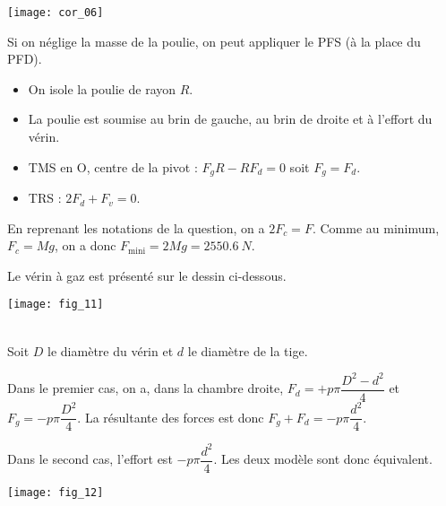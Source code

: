 \begin{multicols}{2}
\begin{corrige}
\begin{center}
\texttt{[image: cor\_06]}
\end{center}

Si on néglige la masse de la poulie, on peut appliquer le PFS (à la place du PFD).

\begin{itemize}
\item On isole la poulie de rayon $R$.
\item La poulie est soumise au brin de gauche, au brin de droite et à l'effort du vérin.
\item TMS en O, centre de la pivot : $F_g R -R F_d = 0$ soit $F_g =F_d$. 
\item TRS : $2F_d+ F_v = 0$. 
\end{itemize}
En reprenant les notations de la question, on a $2F_c = F$.
Comme au minimum, $F_c = Mg$, on a donc $F_{\text{mini}} = 2 Mg = \SI{2550,6}{N}$.
\end{corrige}
\else
\fi

\ifprof
\else
Le vérin à gaz est présenté sur le dessin ci-dessous.
\begin{center}
\texttt{[image: fig\_11]}
\end{center}
\fi

\ifprof
\begin{corrige}~\\
Soit $D$ le diamètre du vérin et $d$ le diamètre de la tige. 

Dans le premier cas, on a, dans la chambre droite, $F_d = + p \pi\dfrac{D^2 - d^2}{4}$ et $F_g =- p \pi\dfrac{D^2}{4}$. La résultante des forces est donc  $F_g +F_d=-p \pi\dfrac{d^2}{4}$.

Dans le second cas, l'effort est $-p \pi\dfrac{d^2}{4}$. Les deux modèle sont donc équivalent.
\end{corrige}
\else
\fi

\ifprof
\else
\begin{center}
\texttt{[image: fig\_12]}
\end{center}
\fi


\end{multicols}
